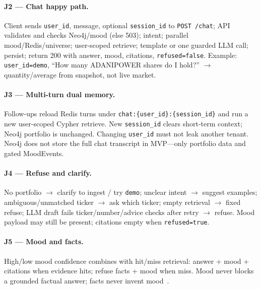 \paragraph{J2 --- Chat happy path.}
Client sends \texttt{user\_id}, message, optional \texttt{session\_id} to \texttt{POST /chat}; API validates and checks Neo4j/mood (else 503); intent; parallel mood/Redis/universe; user-scoped retrieve; template or one guarded LLM call; persist; return 200 with answer, mood, citations, \texttt{refused=false}. Example: \texttt{user\_id=demo}, ``How many ADANIPOWER shares do I hold?'' $\rightarrow$ quantity/average from snapshot, not live market.

\paragraph{J3 --- Multi-turn dual memory.}
Follow-ups reload Redis turns under \texttt{chat:\{user\_id\}:\{session\_id\}} and run a new user-scoped Cypher retrieve. New \texttt{session\_id} clears short-term context; Neo4j portfolio is unchanged. Changing \texttt{user\_id} must not leak another tenant. Neo4j does not store the full chat transcript in MVP---only portfolio data and gated MoodEvents.

\paragraph{J4 --- Refuse and clarify.}
No portfolio $\rightarrow$ clarify to ingest / try \texttt{demo}; unclear intent $\rightarrow$ suggest examples; ambiguous/unmatched ticker $\rightarrow$ ask which ticker; empty retrieval $\rightarrow$ fixed refuse; LLM draft fails ticker/number/advice checks after retry $\rightarrow$ refuse. Mood payload may still be present; citations empty when \texttt{refused=true}.

\paragraph{J5 --- Mood and facts.}
High/low mood confidence combines with hit/miss retrieval: answer + mood + citations when evidence hits; refuse facts + mood when miss. Mood never blocks a grounded factual answer; facts never invent mood~\cite{prd,trd}.

